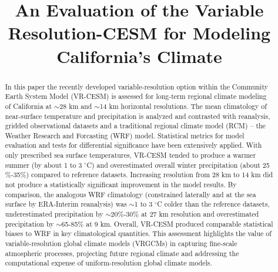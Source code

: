 \documentclass[ms]{agutex}   %
\begin{document}
%
%


\title{An Evaluation of the Variable Resolution-CESM for Modeling California's Climate}




%

\begin{abstract}

In this paper the recently developed variable-resolution option within the Community Earth System Model (VR-CESM) is assessed for long-term regional climate modeling of California at $\sim$28 km and $\sim$14 km horizontal resolutions. The mean climatology of near-surface temperature and precipitation is analyzed and contrasted with reanalysis, gridded observational datasets and a traditional regional climate model (RCM) -- the Weather Research and Forcasting (WRF) model. Statistical metrics for model evaluation and tests for differential significance have been extensively applied. With only prescribed sea surface temperatures, VR-CESM tended to produce a warmer summer (by about 1 to 3 $^\circ$C) and overestimated overall winter precipitation (about 25$\%$-35$\%$) compared to reference datasets. Increasing resolution from 28 km to 14 km did not produce a statistically significant improvement in the model results. By comparison, the analogous WRF climatology (constrained laterally and at the sea surface by ERA-Interim reanalysis) was $\sim$1 to 3 $^\circ$C colder than the reference datasets, underestimated precipitation by $\sim$20$\%$-30$\%$ at 27 km resolution and overestimated precipitation by $\sim$65-85$\%$ at 9 km.  Overall, VR-CESM produced comparable statistical biases to WRF in key climatological quantities.  This assessment highlights the value of variable-resolution global climate models (VRGCMs) in capturing fine-scale atmospheric processes, projecting future regional climate and addressing the computational expense of uniform-resolution global climate models.

\end{abstract} 
\end{document}
